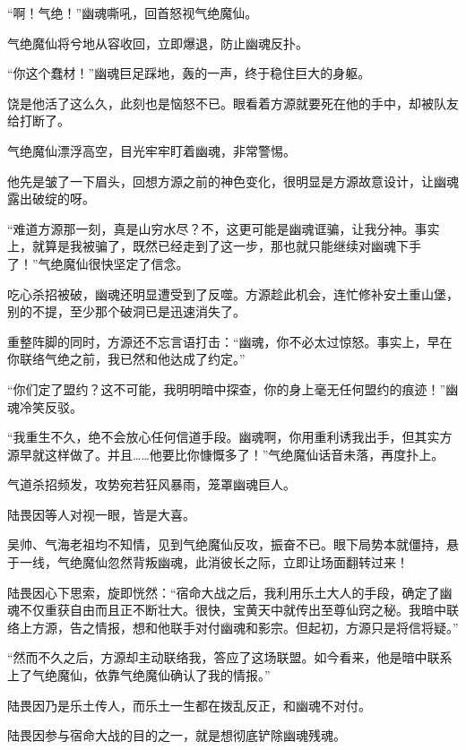 
\begin{this_body}

“啊！气绝！”幽魂嘶吼，回首怒视气绝魔仙。

气绝魔仙将兮地从容收回，立即爆退，防止幽魂反扑。

“你这个蠢材！”幽魂巨足踩地，轰的一声，终于稳住巨大的身躯。

饶是他活了这么久，此刻也是恼怒不已。眼看着方源就要死在他的手中，却被队友给打断了。

气绝魔仙漂浮高空，目光牢牢盯着幽魂，非常警惕。

他先是皱了一下眉头，回想方源之前的神色变化，很明显是方源故意设计，让幽魂露出破绽的呀。

“难道方源那一刻，真是山穷水尽？不，这更可能是幽魂诓骗，让我分神。事实上，就算是我被骗了，既然已经走到了这一步，那也就只能继续对幽魂下手了！”气绝魔仙很快坚定了信念。

吃心杀招被破，幽魂还明显遭受到了反噬。方源趁此机会，连忙修补安土重山堡，别的不提，至少那个破洞已是迅速消失了。

重整阵脚的同时，方源还不忘言语打击：“幽魂，你不必太过惊怒。事实上，早在你联络气绝之前，我已然和他达成了约定。”

“你们定了盟约？这不可能，我明明暗中探查，你的身上毫无任何盟约的痕迹！”幽魂冷笑反驳。

“我重生不久，绝不会放心任何信道手段。幽魂啊，你用重利诱我出手，但其实方源早就这样做了。并且……他要比你慷慨多了！”气绝魔仙话音未落，再度扑上。

气道杀招频发，攻势宛若狂风暴雨，笼罩幽魂巨人。

陆畏因等人对视一眼，皆是大喜。

吴帅、气海老祖均不知情，见到气绝魔仙反攻，振奋不已。眼下局势本就僵持，悬于一线，气绝魔仙忽然背叛幽魂，此消彼长之际，立即让场面翻转过来！

陆畏因心下思索，旋即恍然：“宿命大战之后，我利用乐土大人的手段，确定了幽魂不仅重获自由而且正不断壮大。很快，宝黄天中就传出至尊仙窍之秘。我暗中联络上方源，告之情报，想和他联手对付幽魂和影宗。但起初，方源只是将信将疑。”

“然而不久之后，方源却主动联络我，答应了这场联盟。如今看来，他是暗中联系上了气绝魔仙，依靠气绝魔仙确认了我的情报。”

陆畏因乃是乐土传人，而乐土一生都在拨乱反正，和幽魂不对付。

陆畏因参与宿命大战的目的之一，就是想彻底铲除幽魂残魂。


\end{this_body}
